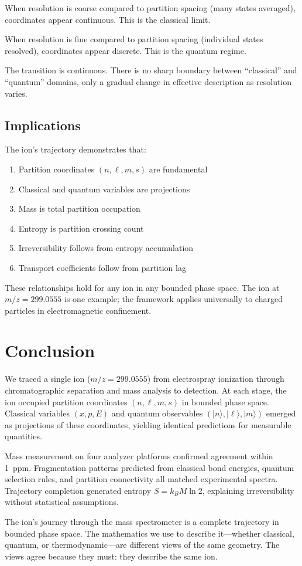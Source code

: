 \documentclass[12pt,a4paper]{article}
\theoremstyle{remark}
\begin{document}
When resolution is coarse compared to partition spacing (many states averaged), coordinates appear continuous. This is the classical limit.

When resolution is fine compared to partition spacing (individual states resolved), coordinates appear discrete. This is the quantum regime.

The transition is continuous. There is no sharp boundary between ``classical'' and ``quantum'' domains, only a gradual change in effective description as resolution varies.

\subsection{Implications}

The ion's trajectory demonstrates that:
\begin{enumerate}
    \item Partition coordinates $(n, \ell, m, s)$ are fundamental
    \item Classical and quantum variables are projections
    \item Mass is total partition occupation
    \item Entropy is partition crossing count
    \item Irreversibility follows from entropy accumulation
    \item Transport coefficients follow from partition lag
\end{enumerate}

These relationships hold for any ion in any bounded phase space. The ion at $m/z = 299.0555$ is one example; the framework applies universally to charged particles in electromagnetic confinement.


\section{Conclusion}
\label{sec:conclusion}

We traced a single ion ($m/z = 299.0555$) from electrospray ionization through chromatographic separation and mass analysis to detection. At each stage, the ion occupied partition coordinates $(n, \ell, m, s)$ in bounded phase space. Classical variables $(x, p, E)$ and quantum observables $(|n\rangle, |\ell\rangle, |m\rangle)$ emerged as projections of these coordinates, yielding identical predictions for measurable quantities.

Mass measurement on four analyzer platforms confirmed agreement within 1~ppm. Fragmentation patterns predicted from classical bond energies, quantum selection rules, and partition connectivity all matched experimental spectra. Trajectory completion generated entropy $S = k_B M \ln 2$, explaining irreversibility without statistical assumptions.

The ion's journey through the mass spectrometer is a complete trajectory in bounded phase space. The mathematics we use to describe it---whether classical, quantum, or thermodynamic---are different views of the same geometry. The views agree because they must: they describe the same ion.




\end{document}
